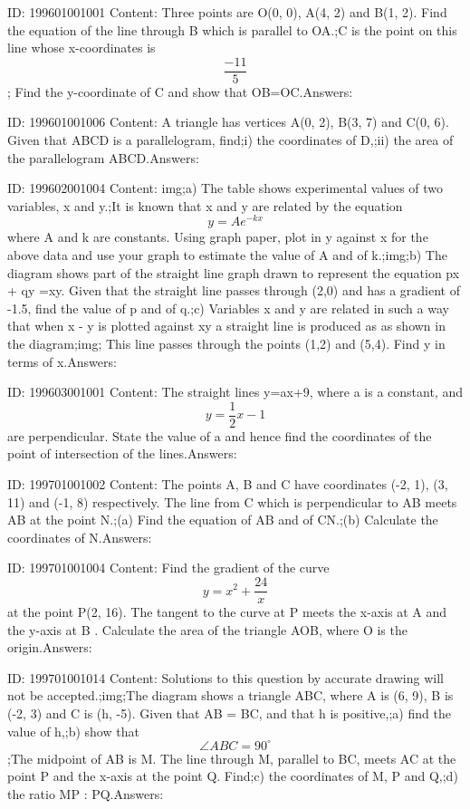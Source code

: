 \documentclass{article}
\begin{document}
ID: 199601001001
Content:
Three points are O(0, 0), A(4, 2) and B(1, 2). Find the equation of the line through B which is parallel to OA.;C is the point on this line whose x-coordinates is \[\frac{-11}{5}\]; Find the y-coordinate of C and show that OB=OC.Answers:

ID: 199601001006
Content:
A triangle has vertices A(0, 2), B(3, 7) and C(0, 6). Given that ABCD is a parallelogram, find;i)	the coordinates of D,;ii)	the area of the parallelogram ABCD.Answers:

ID: 199602001004
Content:
img;a) The table shows experimental values of two variables, x and y.;It is known that x and y are related by the equation \[y=Ae^{-kx}\] where A and k are constants. Using graph paper, plot in y against x for the above data and use your graph to estimate the value of A and of k.;img;b) The diagram shows part of the straight line graph drawn to represent the equation px + qy =xy. Given that the straight line passes through (2,0) and has a gradient of -1.5, find the value of p and of q.;c) Variables x and y are related in such a way that when x - y is plotted against xy a straight line is produced as as shown in the diagram;img; This line passes through the points (1,2) and (5,4). Find y in terms of x.Answers:

ID: 199603001001
Content:
The straight lines y=ax+9, where a is a constant, and \[y=\frac{1}{2}x-1\] are perpendicular. State the value of a and hence find the coordinates of the point of intersection of the lines.Answers:

ID: 199701001002
Content:
The points A, B and C have coordinates (-2, 1), (3, 11) and (-1, 8) respectively. The line from C which is perpendicular to AB meets AB at the point N.;(a)	Find the equation of AB and of CN.;(b)	Calculate the coordinates of N.Answers:

ID: 199701001004
Content:
Find the gradient of the curve \[y=x^2+\frac{24}{x}\] at the point P(2, 16). The tangent to the curve at P meets the x-axis at A and the y-axis at B . Calculate the area of the triangle AOB, where O is the origin.Answers:

ID: 199701001014
Content:
Solutions to this question by accurate drawing will not be accepted.;img;The diagram shows a triangle ABC, where A is (6, 9), B is (-2, 3) and C is (h, -5). Given that AB = BC, and that h is positive,;a)	find the value of h,;b)	show that \[ \angle ABC=90^{\circ}\];The midpoint of AB is M. The line through M, parallel to BC, meets AC at the point P and the x-axis at the point Q. Find;c)	the coordinates of M, P and Q,;d)	the ratio MP : PQ.Answers:
\end{document}
